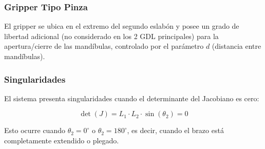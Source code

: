 

\subsubsection{Gripper Tipo Pinza}

El gripper se ubica en el extremo del segundo eslabón y posee un grado de libertad adicional (no considerado en los 2 GDL principales) para la apertura/cierre de las mandíbulas, controlado por el parámetro $d$ (distancia entre mandíbulas).

\subsubsection{Singularidades}

El sistema presenta singularidades cuando el determinante del Jacobiano es cero:

\begin{equation}
    \det(J) = L_1 \cdot L_2 \cdot \sin(\theta_2) = 0
\end{equation}

Esto ocurre cuando \(\theta_2 = 0^\circ \) o \(\theta_2 = 180^\circ\), es decir, cuando el brazo está completamente extendido o plegado.

